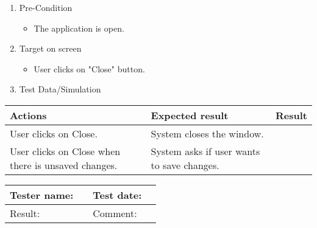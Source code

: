 \begin{enumerate}
	\item Pre-Condition
	\begin{itemize}
		\item The application is open.
	\end{itemize}
	\item Target on screen
	\begin{itemize}
		\item User clicks on "Close" button.
	\end{itemize}
	\item Test Data/Simulation
\end{enumerate}
	\begin{tabularx}{\textwidth}{|X|X|p{2.5cm}|}\hline
		Actions & Expected result & Result \\\hline
		User clicks on Close. & System closes the window. & \pass \\\hline
		User clicks on Close when there is unsaved changes. & System asks if user wants to save changes. & \pass \\\hline
	\end{tabularx}

\begin{tabularx}{\textwidth}{|p{3cm}X|p{3cm}X|}\hline
	Tester name: &  & Test date: & \\\hline
	Result: &  \pass & Comment: & \\\hline
\end{tabularx}






